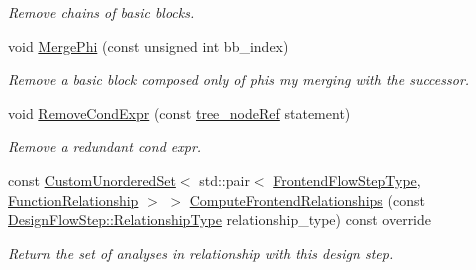 \begin{DoxyCompactItemize}
\begin{DoxyCompactList}\small\item\em Remove chains of basic blocks. \end{DoxyCompactList}\item 
void \hyperlink{classPhiOpt_a8a350fb310bb1fccdc1be60e764c994f}{Merge\+Phi} (const unsigned int bb\+\_\+index)
\begin{DoxyCompactList}\small\item\em Remove a basic block composed only of phis my merging with the successor. \end{DoxyCompactList}\item 
void \hyperlink{classPhiOpt_adf758836dc1fb94b9dacdb0c44e04b8c}{Remove\+Cond\+Expr} (const \hyperlink{tree__node_8hpp_a6ee377554d1c4871ad66a337eaa67fd5}{tree\+\_\+node\+Ref} statement)
\begin{DoxyCompactList}\small\item\em Remove a redundant cond expr. \end{DoxyCompactList}\item 
const \hyperlink{classCustomUnorderedSet}{Custom\+Unordered\+Set}$<$ std\+::pair$<$ \hyperlink{frontend__flow__step_8hpp_afeb3716c693d2b2e4ed3e6d04c3b63bb}{Frontend\+Flow\+Step\+Type}, \hyperlink{classFrontendFlowStep_af7cf30f2023e5b99e637dc2058289ab0}{Function\+Relationship} $>$ $>$ \hyperlink{classPhiOpt_ab3c872c6509a082eb92c957a6afc1de1}{Compute\+Frontend\+Relationships} (const \hyperlink{classDesignFlowStep_a723a3baf19ff2ceb77bc13e099d0b1b7}{Design\+Flow\+Step\+::\+Relationship\+Type} relationship\+\_\+type) const override
\begin{DoxyCompactList}\small\item\em Return the set of analyses in relationship with this design step. \end{DoxyCompactList}\end{DoxyCompactItemize}
